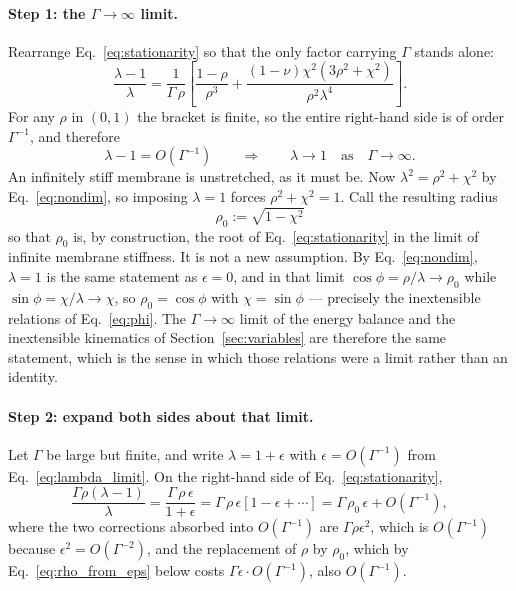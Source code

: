 \documentclass[11pt]{article}
\begin{document}
\paragraph{Step 1: the $\Gamma \to \infty$ limit.} Rearrange
Eq.~\eqref{eq:stationarity} so that the only factor carrying $\Gamma$ stands
alone:
\begin{equation}\label{eq:stationarity_rearranged}
    \frac{\lambda-1}{\lambda}
      = \frac{1}{\Gamma\,\rho}\left[\frac{1-\rho}{\rho^{3}}
        + \frac{\left(1-\nu\right)\chi^{2}\left(3\rho^{2}+\chi^{2}\right)}
          {\rho^{2}\lambda^{4}}\right].
\end{equation}
For any $\rho$ in $(0,1)$ the bracket is finite, so the entire right-hand side is
of order $\Gamma^{-1}$, and therefore
\begin{equation}\label{eq:lambda_limit}
    \lambda - 1 = O\!\left(\Gamma^{-1}\right)
    \qquad\Longrightarrow\qquad
    \lambda \to 1 \quad \text{as} \quad \Gamma \to \infty .
\end{equation}
An infinitely stiff membrane is unstretched, as it must be. Now
$\lambda^{2} = \rho^{2}+\chi^{2}$ by Eq.~\eqref{eq:nondim}, so imposing
$\lambda = 1$ forces $\rho^{2}+\chi^{2} = 1$. Call the resulting radius
\begin{equation}\label{eq:rho_zero}
    \boxed{\;\rho_0 := \sqrt{1-\chi^{2}}\;}
\end{equation}
so that $\rho_0$ is, by construction, the root of Eq.~\eqref{eq:stationarity} in
the limit of infinite membrane stiffness. It is not a new assumption. By
Eq.~\eqref{eq:nondim}, $\lambda = 1$ is the same statement as $\epsilon = 0$, and
in that limit $\cos\phi = \rho/\lambda \to \rho_0$ while
$\sin\phi = \chi/\lambda \to \chi$, so $\rho_0 = \cos\phi$ with
$\chi = \sin\phi$ --- precisely the inextensible relations of
Eq.~\eqref{eq:phi}. The $\Gamma \to \infty$ limit of the energy balance and the
inextensible kinematics of Section~\ref{sec:variables} are therefore the same
statement, which is the sense in which those relations were a limit rather than
an identity.

\paragraph{Step 2: expand both sides about that limit.} Let $\Gamma$ be large but
finite, and write $\lambda = 1+\epsilon$ with $\epsilon = O(\Gamma^{-1})$ from
Eq.~\eqref{eq:lambda_limit}. On the right-hand side of
Eq.~\eqref{eq:stationarity},
\begin{equation}\label{eq:rhs_expand}
    \frac{\Gamma\rho\left(\lambda-1\right)}{\lambda}
      = \frac{\Gamma\,\rho\,\epsilon}{1+\epsilon}
      = \Gamma\,\rho\,\epsilon\left[1 - \epsilon + \cdots\right]
      = \Gamma\,\rho_0\,\epsilon + O\!\left(\Gamma^{-1}\right),
\end{equation}
where the two corrections absorbed into $O(\Gamma^{-1})$ are
$\Gamma\rho\epsilon^{2}$, which is $O(\Gamma^{-1})$ because
$\epsilon^{2} = O(\Gamma^{-2})$, and the replacement of $\rho$ by $\rho_0$, which
by Eq.~\eqref{eq:rho_from_eps} below costs $\Gamma\epsilon\cdot O(\Gamma^{-1})$,
also $O(\Gamma^{-1})$.
\end{document}
